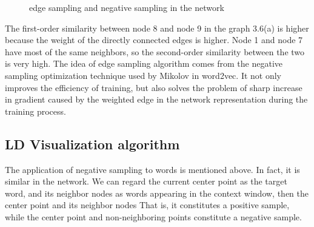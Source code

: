 \begin{figure}[H]
\centering  %
\caption{edge sampling and negative sampling in the network}
\end{figure}


\noindent The first-order similarity between node 8 and node 9 in the graph 3.6(a) is higher because the weight of the directly connected edges is higher. Node 1 and node 7 have most of the same neighbors, so the second-order similarity between the two is very high. The idea of edge sampling algorithm comes from the negative sampling optimization technique used by Mikolov in word2vec\cite{ref7}. It not only improves the efficiency of training, but also solves the problem of sharp increase in gradient caused by the weighted edge in the network representation during the training process.\\

\subsection{LD Visualization algorithm}

\noindent The application of negative sampling to words is mentioned above. In fact, it is similar in the network. We can regard the current center point as the target word, and its neighbor nodes as words appearing in the context window, then the center point and its neighbor nodes That is, it constitutes a positive sample, while the center point and non-neighboring points constitute a negative sample.\\

